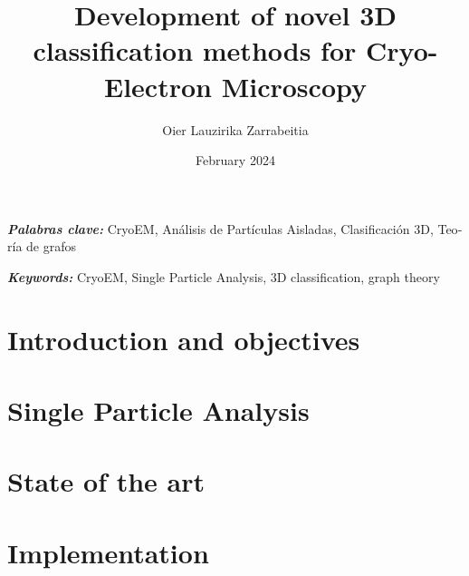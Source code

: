 \documentclass{etsit-report}
\title{Development of novel 3D classification methods for Cryo-Electron Microscopy}
\author{Oier Lauzirika Zarrabeitia}
\date{February 2024}
\begin{document}
\frontmatter

\cleardoublepage
\makefrontpage

\cleardoublepage
\makeinfopage

\cleardoublepage
\maketitle

\newpage\thispagestyle{empty}
\begin{otherlanguage}{spanish}
\begin{abstract}
    
\end{abstract}
\textit{\textbf{Palabras clave:}}
CryoEM, Análisis de Partículas Aisladas, Clasificación 3D, Teoría de grafos
\glsresetall

\newpage\thispagestyle{empty}
\end{otherlanguage}
\begin{abstract}
    
\end{abstract}
\textit{\textbf{Keywords: }}
CryoEM, Single Particle Analysis, 3D classification, graph theory
\glsresetall

\cleardoublepage
\tableofcontents
\listoffigures
\listoftables

\printglossary[type=\acronymtype]

\mainmatter

\chapter{Introduction and objectives}
\label{chap:introduction}


\chapter{Single Particle Analysis}
\label{chap:spa}


\chapter{State of the art}
\label{chap:state_of_the_art}


\chapter{Implementation}
\label{chap:implementation}

\end{document}
